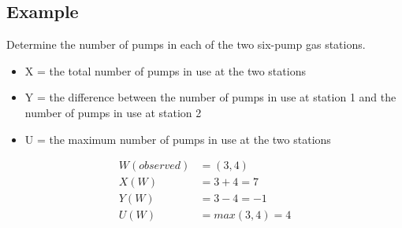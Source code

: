 \documentclass[letterpaper, 12pt]{math}
\begin{document}
\subsection*{Example}
Determine the number of pumps in each of the two six-pump gas stations.
\begin{itemize}
  \item X = the total number of pumps in use at the two stations
  \item Y = the difference between the number of pumps in use at station 1 and
    the number of pumps in use at station 2
  \item U = the maximum number of pumps in use at the two stations
\end{itemize}
\begin{align*}
  W(observed) &= (3,4) \\
  X(W) &= 3+4 = 7 \\
  Y(W) &= 3-4 = -1 \\
  U(W) &= max(3,4) = 4
\end{align*}
\end{document}
